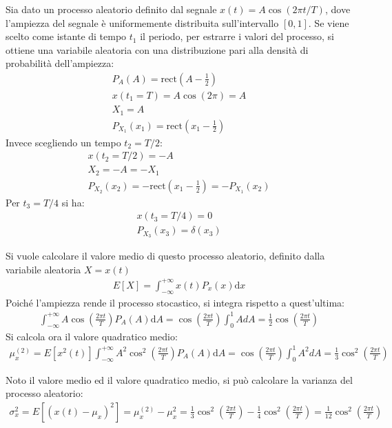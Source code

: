 \documentclass{article}
\newcommand{\rect}{\mathrm{rect}}
\newcommand{\df}{\mathrm{d}}
\numberwithin{equation}{subsection}
\begin{document}
Sia dato un processo aleatorio definito dal segnale $x(t)=A\cos(2\pi t/T)$, dove l'ampiezza del segnale è uniformemente distribuita sull'intervallo $[0,1]$. 
Se viene scelto come istante di tempo $t_1$ il periodo, per estrarre i valori del processo, si ottiene una variabile aleatoria con una distribuzione pari alla densità di probabilità 
dell'ampiezza:
\begin{gather*}
    P_A(A)=\rect\displaystyle\left(A-\frac{1}{2}\right)\\
    x(t_1=T)=A\cos(2\pi)=A\\
    X_1=A\\
    P_{X_1}(x_1)=\displaystyle\rect\left(x_1-\frac{1}{2}\right)
\end{gather*}
Invece scegliendo un tempo $t_2=T/2$:
\begin{gather*}
    x(t_2=T/2)=-A\\
    X_2=-A=-X_1\\
    P_{X_2}(x_2)=-\displaystyle\rect\left(x_1-\frac{1}{2}\right)=-P_{X_1}(x_2)
\end{gather*}
Per $t_3=T/4$ si ha:
\begin{gather*}
    x(t_3=T/4)=0\\
    P_{X_3}(x_3)=\delta(x_3)
\end{gather*}

Si vuole calcolare il valore medio di questo processo aleatorio, definito dalla variabile aleatoria $X=x(t)$
\begin{gather*}
    E[X]=\displaystyle\int_{-\infty}^{+\infty}x(t)P_x(x)\df x
\end{gather*}
Poiché l'ampiezza rende il processo stocastico, si integra rispetto a quest'ultima:
\begin{gather*}
    \displaystyle\int_{-\infty}^{+\infty}A\cos\left(\frac{2\pi t}{T}\right)P_A(A)\df A=\cos\left(\frac{2\pi t}{T}\right)\int_0^1AdA=\frac{1}{2}\cos\left(\frac{2\pi t}{T}\right)
\end{gather*}
Si calcola ora il valore quadratico medio:
\begin{gather*}
    \mu_x^{(2)}=E[x^2(t)]\displaystyle\int_{-\infty}^{+\infty}A^2\cos^2\left(\frac{2\pi t}{T}\right)P_A(A)\df A=\cos\left(\frac{2\pi t}{T}\right)\int_0^1A^2dA=\frac{1}{3}\cos^2\left(\frac{2\pi t}{T}\right)
\end{gather*}


Noto il valore medio ed il valore quadratico medio, si può calcolare la varianza del processo aleatorio:
\begin{gather*}
    \sigma_x^2=E[(x(t)-\mu_x)^2]=\mu_x^{(2)}-\mu_x^2=\displaystyle\frac{1}{3}\cos^2\left(\frac{2\pi t}{T}\right)-\frac{1}{4}\cos^2\left(\frac{2\pi t}{T}\right)=\frac{1}{12}\cos^2\left(\frac{2\pi t}{T}\right)
\end{gather*}
\end{document}
